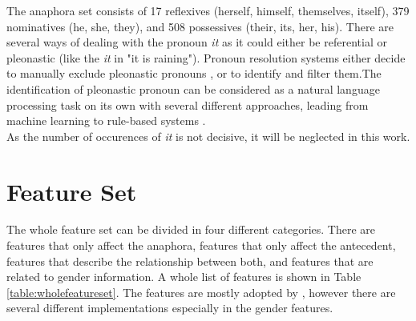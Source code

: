 The anaphora set consists of 17 reflexives (herself, himself, themselves, itself), 379 nominatives (he, she, they), and 508 possessives (their, its, her, his). There are several ways of dealing with the pronoun \textit{it} as it could either be referential or pleonastic (like the \textit{it} in "it is raining"). Pronoun resolution systems either decide to manually exclude pleonastic pronouns \citep{kennedy1996anaphora,bergsma2005automatic}, or to identify and filter them.The identification of pleonastic pronoun can be considered as a natural language processing task on its own with several different approaches, leading from machine learning \citep{boyd2005identifying} to rule-based systems \citep{lappin1994algorithm}.\\
As the number of occurences of \textit{it} is not decisive, it will be neglected in this work.


\section{Feature Set}
The whole feature set can be divided in four different categories. There are features that only affect the anaphora, features that only affect the antecedent, features that describe the relationship between both, and features that are related to gender information. A whole list of features is shown in Table \ref{table:wholefeatureset}. The features are mostly adopted by \cite{bergsma2005automatic}, however there are several different implementations especially in the gender features.


